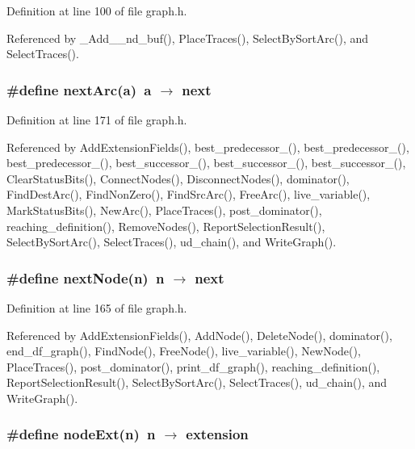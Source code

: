 Definition at line 100 of file graph.h.

Referenced by \_\-Add\_\_\-nd\_\-buf(), Place\-Traces(), Select\-By\-Sort\-Arc(), and Select\-Traces().
\subsubsection{\setlength{\rightskip}{0pt plus 5cm}\#define next\-Arc(a)~a $\rightarrow$ next}\label{graph_8h_6aae5c137b652676cb6c0c7d5da295ca}




Definition at line 171 of file graph.h.

Referenced by Add\-Extension\-Fields(), best\_\-predecessor\_(), best\_\-predecessor\_(), best\_\-predecessor\_(), best\_\-successor\_(), best\_\-successor\_(), best\_\-successor\_(), Clear\-Status\-Bits(), Connect\-Nodes(), Disconnect\-Nodes(), dominator(), Find\-Dest\-Arc(), Find\-Non\-Zero(), Find\-Src\-Arc(), Free\-Arc(), live\_\-variable(), Mark\-Status\-Bits(), New\-Arc(), Place\-Traces(), post\_\-dominator(), reaching\_\-definition(), Remove\-Nodes(), Report\-Selection\-Result(), Select\-By\-Sort\-Arc(), Select\-Traces(), ud\_\-chain(), and Write\-Graph().
\subsubsection{\setlength{\rightskip}{0pt plus 5cm}\#define next\-Node(n)~n $\rightarrow$ next}\label{graph_8h_7324185d51de44cbd746d4f79a9b4bd1}




Definition at line 165 of file graph.h.

Referenced by Add\-Extension\-Fields(), Add\-Node(), Delete\-Node(), dominator(), end\_\-df\_\-graph(), Find\-Node(), Free\-Node(), live\_\-variable(), New\-Node(), Place\-Traces(), post\_\-dominator(), print\_\-df\_\-graph(), reaching\_\-definition(), Report\-Selection\-Result(), Select\-By\-Sort\-Arc(), Select\-Traces(), ud\_\-chain(), and Write\-Graph().
\subsubsection{\setlength{\rightskip}{0pt plus 5cm}\#define node\-Ext(n)~n $\rightarrow$ extension}\label{graph_8h_e2dddc8637850a5caa0aafcd9842b8f8}




